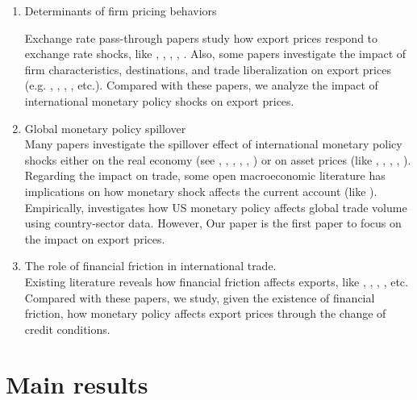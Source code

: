 \documentclass[12pt]{article}
\begin{document}
\begin{enumerate}

\item Determinants of firm pricing behaviors

Exchange rate pass-through papers study how export prices respond to exchange rate shocks, like \cite{obstfeld2000six}, \cite{amiti2014importers}, \cite{li2015exchange}, \cite{devereux2017importers}, \cite{auer2018quality}. Also, some papers investigate the impact of firm characteristics, destinations, and trade liberalization on export prices (e.g. \cite{manova2012export}, \cite{fan2015credit}, \cite{harrigan2015export}, \cite{fan2015trade}, etc.). Compared with these papers, we analyze the impact of international monetary policy shocks on export prices.

\item Global monetary policy spillover\\
Many papers investigate the spillover effect of international monetary policy shocks either on the real economy (see \cite{kim2001international}, \cite{faust2003monetary}, \cite{faust2003identifying}, \cite{mackowiak2007external}, \cite{di2008impact}, \cite{bluedorn2011open}) or on asset prices (like \cite{craine2008international}, \cite{wongswan2009response}, \cite{hausman2011global}, \cite{rogers2014evaluating}, \cite{miranda2020us}). Regarding the impact on trade, some open macroeconomic literature has implications on how monetary shock affects the current account (like \cite{obstfeld1995exchange}). Empirically, \cite{lin2018international} investigates how US monetary policy affects global trade volume using country-sector data. However, Our paper is the first paper to focus on the impact on export prices.

\item The role of financial friction in international trade.\\
Existing literature reveals how financial friction affects exports, like \cite{manova2013credit}, \cite{fan2015credit}, \cite{manova2015firm}, \cite{lin2018international}, etc. Compared with these papers, we study, given the existence of financial friction, how monetary policy affects export prices through the change of credit conditions. 

\end{enumerate}

\section{Main results}
\end{document}
